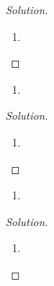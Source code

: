 \begin{proof}[Solution]
\hfill
\begin{enumerate}[font=\normalfont,label=\textbf{(\alph*)}, wide]
\item
\end{enumerate}
\end{proof}

\newpage



\begin{problem}
\hfill
\begin{enumerate}[font=\normalfont,label=\textbf{(\alph*)}, wide]
\item
\end{enumerate}
\end{problem}

\begin{proof}[Solution]
\hfill
\begin{enumerate}[font=\normalfont,label=\textbf{(\alph*)}, wide]
\item
\end{enumerate}
\end{proof}

\newpage



\begin{problem}
\hfill
\begin{enumerate}[font=\normalfont,label=\textbf{(\alph*)}, wide]
\item
\end{enumerate}
\end{problem}

\begin{proof}[Solution]
\hfill
\begin{enumerate}[font=\normalfont,label=\textbf{(\alph*)}, wide]
\item
\end{enumerate}
\end{proof}

\newpage





